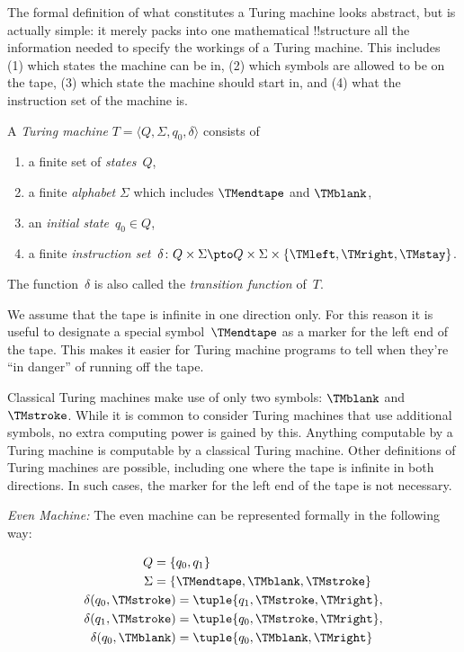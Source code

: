 \documentclass[../../../include/open-logic-section]{subfiles}
\begin{document}

\begin{explain}
The formal definition of what constitutes a Turing machine looks
abstract, but is actually simple: it merely packs into one
mathematical !!{structure} all the information needed to specify the
workings of a Turing machine. This includes (1) which states the
machine can be in, (2) which symbols are allowed to be on the tape, (3)
which state the machine should start in, and (4) what the instruction
set of the machine is.
\end{explain}

\begin{defn}
A \emph{Turing machine} $T = \langle Q, \Sigma, q_0, \delta\rangle$ consists of
\begin{enumerate}
\item a finite set of \emph{states}~$Q$,
\item a finite \emph{alphabet} $\Sigma$ which includes $\TMendtape$ and
  $\TMblank$,
\item an \emph{initial state}~$q_0 \in Q$,
\item a finite \emph{instruction set}~$\delta\colon Q \times \Sigma
  \pto Q \times \Sigma \times \{\TMleft, \TMright, \TMstay\}$.
\end{enumerate}
The function~$\delta$ is also called the \emph{transition function} of~$T$.
\end{defn}

\begin{explain}
We assume that the tape is infinite in one direction only. For this
reason it is useful to designate a special symbol~$\TMendtape$ as
a marker for the left end of the tape. This makes it easier for
Turing machine programs to tell when they're ``in danger'' of running
off the tape. 

Classical Turing machines make use of only two symbols: $\TMblank$ and
$\TMstroke$. While it is common to consider Turing machines that use additional
symbols, no extra computing power is gained by this. Anything computable by
a Turing machine is computable by a classical Turing machine. Other
definitions of Turing machines are possible,
including one where the tape is infinite in both directions. In such cases,
the marker for the left end of the tape is not necessary.
\end{explain}

\begin{ex}
\emph{Even Machine:} The even machine can be represented formally
in the following way:

\begin{align*}
Q = \{ & q_0, q_1 \} \\
\Sigma = \{ & \TMendtape, \TMblank, \TMstroke \} \\
\delta(q_0, \TMstroke) & = \tuple{q_1, \TMstroke, \TMright},\\
\delta(q_1, \TMstroke) & = \tuple{q_0, \TMstroke, \TMright},\\
\delta(q_0, \TMblank)  & = \tuple{q_0, \TMblank, \TMright}
\end{align*}
\end{ex}
\end{document}
